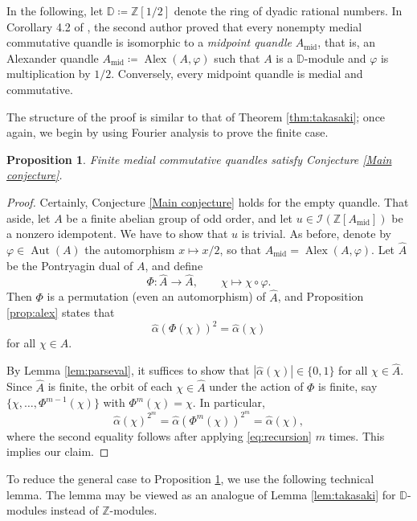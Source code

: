 \documentclass[12pt]{amsart}
\newtheorem{pro}[thm]{Proposition}
\theoremstyle{definition}
\theoremstyle{remark}
\newcommand{\Z}{\mathbb{Z}}
\newcommand{\I}{\mathcal{I}}
\newcommand{\A}{\widehat{A}}
\newcommand{\Alpha}{\widehat{\alpha}}
\renewcommand{\phi}{\varphi}
\newcommand{\Mid}{_{\operatorname{mid}}}
\def\Aut{\operatorname{Aut}}
\def\Alex{\operatorname{Alex}}
\begin{document}
In the following, let $\mathbb{D}\coloneq\Z[1/2]$ denote the ring of dyadic rational numbers. In Corollary 4.2 of \cite{ta-2026}, the second author proved that every nonempty medial commutative quandle is isomorphic to a \emph{midpoint quandle} $A\Mid$, that is, an Alexander quandle $A\Mid\coloneq \Alex(A,\phi)$ such that $A$ is a $\mathbb{D}$-module and $\phi$ is multiplication by $1/2$. Conversely, every midpoint quandle is medial and commutative. 

The structure of the proof is similar to that of Theorem \ref{thm:takasaki}; once again, we begin by using Fourier analysis to prove the finite case.

\begin{pro}\label{pro:finite-comm}
    Finite medial commutative quandles satisfy Conjecture \ref{Main conjecture}. 
\end{pro}

\begin{proof}
    Certainly, Conjecture \ref{Main conjecture} holds for the empty quandle. That aside, let $A$ be a finite abelian group of odd order, and let $u\in\I(\Z[A\Mid])$ be a nonzero idempotent. We have to show that $u$ is trivial. As before, denote by $\phi\in\Aut(A)$ the automorphism $x\mapsto x/2$, so that $A\Mid=\Alex(A,\phi)$. Let $\A$ be the Pontryagin dual of $A$, and define
    \[
    \Phi\colon \A\to\A,\qquad \chi\mapsto\chi\circ\phi.
    \]
    Then $\Phi$ is a permutation (even an automorphism) of $\A$, and Proposition \ref{prop:alex} states that
    \begin{equation}\label{eq:recursion}
        \Alpha(\Phi(\chi))^2=\Alpha(\chi)
    \end{equation}
    for all $\chi\in\A$.

    By Lemma \ref{lem:parseval}, it suffices to show that $|\Alpha (\chi)|\in\{0,1\}$ for all $\chi\in \A$. Since $\A$ is finite, the orbit of each $\chi\in\A$ under the action of $\Phi$ is finite, say $\{\chi,\dots,\Phi^{m-1}(\chi)\}$ with $\Phi^m(\chi)=\chi$. In particular,
    \[
    \Alpha(\chi)^{2^m}=\Alpha(\Phi^{m}(\chi))^{2^m}=\Alpha(\chi),
    \]
    where the second equality follows after applying \eqref{eq:recursion} $m$ times. 
    This implies our claim.
\end{proof}

To reduce the general case to Proposition \ref{pro:finite-comm}, we use the following technical lemma. The lemma may be viewed as an analogue of Lemma \ref{lem:takasaki} for $\mathbb{D}$-modules instead of $\Z$-modules.
\end{document}
